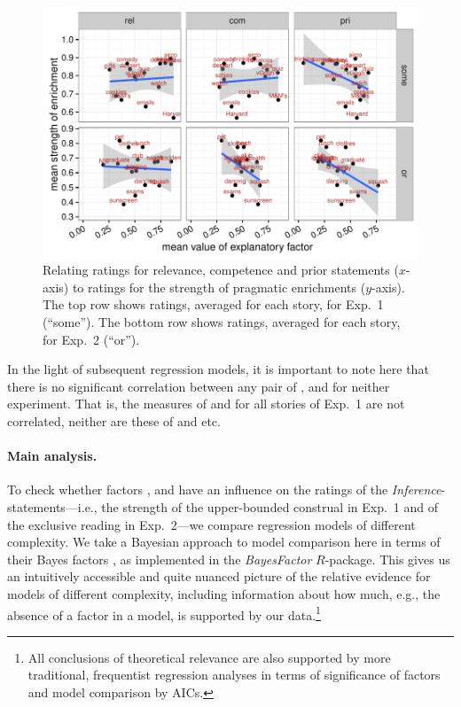 \documentclass[12pt]{article}
\begin{document}
\begin{figure}
  \centering

  \includegraphics[width = \textwidth]{pics_02/correlationExp12.pdf}
  
  \caption{Relating ratings for relevance, competence and prior statements ($x$-axis) to
    ratings for the strength of pragmatic enrichments ($y$-axis). The top row shows ratings,
    averaged for each story, for Exp.~1 (``some''). The bottom row shows ratings,
    averaged for each story, for Exp.~2 (``or'').}
  \label{fig:correlationsExp12}
\end{figure}

In the light of subsequent regression models, it is important to note here that there is no
significant correlation between any pair of \rel, \com and \pri for neither experiment. That is,
the measures of \rel and \com for all stories of Exp.~1 are not correlated, neither are these
of \rel and \pri etc.

\paragraph{Main analysis.} To check whether factors \rel, \com and \pri have an influence on
the ratings of the \emph{Inference}-statements---i.e., the strength of the upper-bounded construal in Exp.~1 and
of the exclusive reading in Exp.~2---we compare regression models of different
complexity. We take a Bayesian approach to model comparison here in terms of their Bayes
factors \citep{RouderMorey2012:Default-Bayes-F}, as implemented in the \emph{BayesFactor}
$R$-package. This gives us an intuitively accessible and quite nuanced picture of the relative
evidence for models of different complexity, including information about how much, e.g., the
absence of a factor in a model, is supported by our data.\footnote{All conclusions of
  theoretical relevance are also supported by more traditional, frequentist regression analyses
  in terms of significance of factors and model comparison by AICs.}
\end{document}
